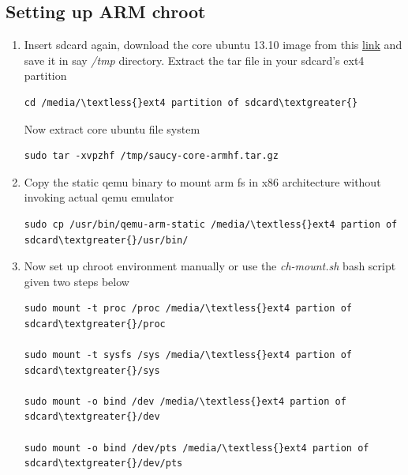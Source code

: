 \documentclass[letterpaper,10pt,english]{sphinxmanual}
\begin{document}
\subsection{Setting up ARM chroot}
\label{embedded-linux:setting-up-arm-chroot}\begin{enumerate}
\item {} 
Insert sdcard again, download the core ubuntu 13.10 image from this \href{http://cdimage.ubuntu.com/ubuntu-core/daily/current/saucy-core-armhf.tar.gz}{link} and save it in say \emph{/tmp} directory. Extract the tar file in your sdcard's ext4 partition

\begin{Verbatim}[commandchars=\\\{\}]
cd /media/\textless{}ext4 partition of sdcard\textgreater{}
\end{Verbatim}

Now extract core ubuntu file system

\begin{Verbatim}[commandchars=\\\{\}]
sudo tar -xvpzhf /tmp/saucy-core-armhf.tar.gz
\end{Verbatim}

\item {} 
Copy the static qemu binary to mount arm fs in x86 architecture without invoking actual qemu emulator

\begin{Verbatim}[commandchars=\\\{\}]
sudo cp /usr/bin/qemu-arm-static /media/\textless{}ext4 partion of sdcard\textgreater{}/usr/bin/
\end{Verbatim}

\item {} 
Now set up chroot environment manually or use the \emph{ch-mount.sh} bash
script given two steps below

\begin{Verbatim}[commandchars=\\\{\}]
sudo mount -t proc /proc /media/\textless{}ext4 partion of sdcard\textgreater{}/proc

sudo mount -t sysfs /sys /media/\textless{}ext4 partion of sdcard\textgreater{}/sys

sudo mount -o bind /dev /media/\textless{}ext4 partion of sdcard\textgreater{}/dev

sudo mount -o bind /dev/pts /media/\textless{}ext4 partion of sdcard\textgreater{}/dev/pts
\end{Verbatim}


\end{enumerate}
\end{document}
